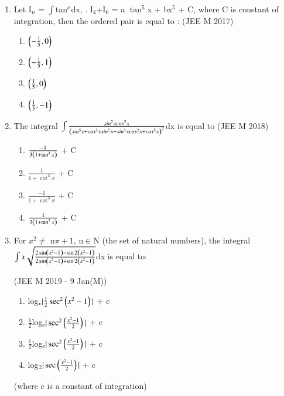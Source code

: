 \documentclass[journal,12pt,twocolumn]{IEEEtran}
\theoremstyle{remark}
\begin{document}
\begin{enumerate}[label=\textcolor{black}{\arabic*.}]
	\item Let I$_n$ = $\int$tan$^x$dx, . I$_4$+I$_6$ = a $\tan^5$x + bx$^5$ + C, where C is constant of integration, then the ordered pair  is equal to :
		\hfill{(JEE M 2017)}

		\begin{multicols}{4}
			\begin{enumerate}[label=(\alph*)]
				\item $\left(-\frac{1}{5}, 0\right)$
				\item $\left(-\frac{1}{5}, 1\right)$
				\item $\left(\frac{1}{5}, 0\right)$
				\item $\left(\frac{1}{5},-1\right)$
			\end{enumerate}
		\end{multicols}
		
	\item The integral $\int\frac{sin^2xcos^2x}{\left(sin^5x+cos^3xsin^2x+sin^3xcos^2x+cos^5x\right)^2}$dx is equal to
		\hfill{(JEE M 2018)}
		
		\begin{multicols}{2}
			\begin{enumerate}[label=(\alph*)]
				\item $\frac{-1}{3\left(1+\tan ^3x\right)}$ + C
				\item $\frac{1}{1+\cot ^3x}$ + C
				\item $\frac{-1}{1+\cot ^3x}$ + C
				\item $\frac{1}{3\left(1+\tan ^3x\right)}$ + C
			\end{enumerate}
		\end{multicols}
		
	\item For $x^2\neq$ n$\pi+1$, n$\in$N (the set of natural numbers), the integral $\int x\sqrt{\frac{2\sin \left(x^2-1\right)-\sin 2\left(x^2-1\right)}{2\sin \left(x^2-1\right)+\sin 2\left(x^2-1\right)}}$dx is equal to:

		\hfill{(JEE M 2019 - 9 Jan(M))}

		\begin{multicols}{1}
			\begin{enumerate}[label=(\alph*)]
				\item log$_e|\frac{1}{2}\sec ^2\left(x^2-1\right)|$ + c
				\item $\frac{1}{2}$log$_e|\sec ^2\left(\frac{x^2-1}{2}\right)|$ + c
				\item $\frac{1}{2}$log$_e|\sec ^2\left(\frac{x^2-1}{2}\right)|$ + c
				\item log$_2|\sec \left(\frac{x^2-1}{2}\right)|$ + c
			\end{enumerate}
		\end{multicols}
		(where c is a constant of integration)


\end{enumerate}
\end{document}
